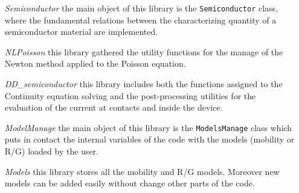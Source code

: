 \begin{itemize}[leftmargin=3.7cm]
\item[\textit{Semiconductor}] the main object of this library is the \texttt{Semiconductor} class, where the fundamental relations between the characterizing quantity of a semiconductor material are implemented.  

\item[\textit{NLPoisson}] this library gathered the utility functions for the manage of the Newton method applied to the Poisson equation.

\item[\textit{DD\_semiconductor}] this library includes both the functions assigned to the Continuity equation solving and the post-processing utilities for the evaluation of the current at contacts and inside the device.

\item[\textit{ModelManage}] the main object of this library is the \texttt{ModelsManage} class which puts in contact the internal variables of the code with the models (mobility or R/G) loaded by the user.

\item[\textit{Models}] this library stores all the mobility and R/G models. Moreover new models can be added easily without change other parts of the code.
\end{itemize}

